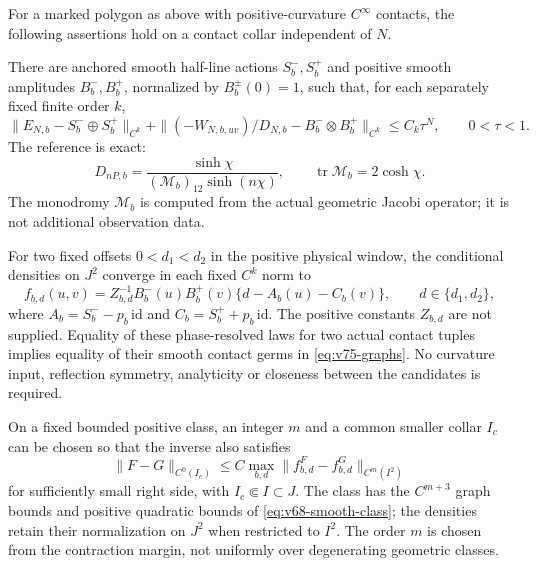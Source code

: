 \begin{theorem}
\label{thm:v75-main}\label{thm:v70-main}
For a marked polygon as above with positive-curvature $C^\infty$
contacts, the following assertions hold on a contact collar independent
of $N$.

There are anchored smooth half-line actions $S_b^-,S_b^+$ and positive
smooth amplitudes $B_b^-,B_b^+$, normalized by $B_b^\pm(0)=1$, such
that, for each separately fixed finite order $k$,
\begin{equation}\label{eq:v75-relative}
 \|E_{N,b}-S_b^-\oplus S_b^+\|_{C^k}
 +\|(-W_{N,b,uv})/D_{N,b}-B_b^-\otimes B_b^+\|_{C^k}
 \le C_k\tau^N,\qquad 0<\tau<1.
\end{equation}
The reference is exact:
\begin{equation}\label{eq:v75-reference}
 D_{nP,b}=\frac{\sinh\chi}
  {(\mathcal M_b)_{12}\sinh(n\chi)},\qquad
 \operatorname{tr}\mathcal M_b=2\cosh\chi.
\end{equation}
The monodromy $\mathcal M_b$ is computed from the actual geometric
Jacobi operator; it is not additional observation data.

For two fixed offsets $0<d_1<d_2$ in the positive physical window,
the conditional densities on $J^2$ converge in each fixed $C^k$ norm
to
\begin{equation}\label{eq:v75-law}
 f_{b,d}(u,v)=Z_{b,d}^{-1}B_b^-(u)B_b^+(v)
       \{d-A_b(u)-C_b(v)\},\qquad d\in\{d_1,d_2\},
\end{equation}
where $A_b=S_b^--p_b\,\mathrm{id}$ and
$C_b=S_b^++p_b\,\mathrm{id}$.  The positive constants $Z_{b,d}$
are not supplied.  Equality of these phase-resolved laws for two actual
contact tuples implies equality of their smooth contact germs in
\eqref{eq:v75-graphs}.  No curvature input, reflection symmetry,
analyticity or closeness between the candidates is required.

On a fixed bounded positive class, an integer $m$ and a common smaller
collar $I_c$ can be chosen so that the inverse also satisfies
\begin{equation}\label{eq:v75-stability}
 \|F-G\|_{C^0(I_c)}
 \le C\max_{b,d}\|f^F_{b,d}-f^G_{b,d}\|_{C^m(I^2)}
\end{equation}
for sufficiently small right side, with $I_c\Subset I\subset J$.
The class has the $C^{m+3}$ graph bounds and positive quadratic bounds
of \eqref{eq:v68-smooth-class}; the densities retain their normalization
on $J^2$ when restricted to $I^2$.  The order $m$ is chosen from the
contraction margin, not uniformly over degenerating geometric classes.
\end{theorem}
